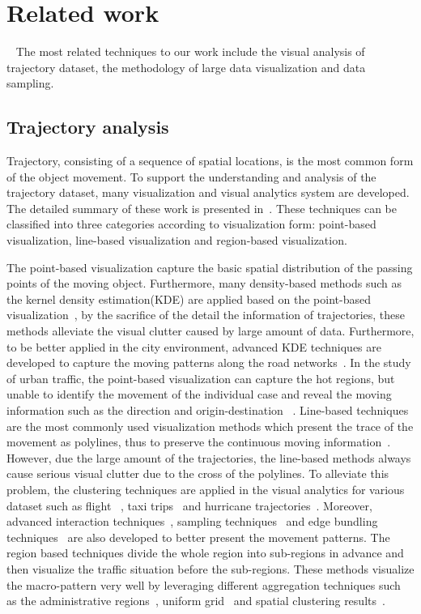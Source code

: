 \section{Related work}~\label{sec:rel}
The most related techniques to our work include the visual analysis of trajectory dataset, the methodology of large data visualization and data sampling. 
\subsection{Trajectory analysis}
Trajectory, consisting of a sequence of spatial locations, is the most common form of the object movement. To support the understanding and analysis of the trajectory dataset, many visualization and visual analytics system are developed. The detailed summary of these work is presented in~\cite{chen2015survey}. These techniques can be classified into three categories according to visualization form: point-based visualization, line-based visualization and region-based visualization. 

The point-based visualization capture the basic spatial distribution of the passing points of the moving object. Furthermore, many density-based methods such as the kernel density estimation(KDE) are applied based on the point-based visualization~\cite{liu2013vait,yang2016exploring,chae2014public}, by the sacrifice of the detail the information of trajectories, these methods alleviate the visual clutter caused by large amount of data. 
Furthermore, to be better applied in the city environment, advanced KDE techniques are developed to capture the moving patterns along the road networks~\cite{xie2008kernel, borruso2008network}. In the study of urban traffic, the point-based visualization can capture the hot regions, but unable to identify the movement of the individual case and reveal the moving information such as the direction and origin-destination ~\cite{chen2015survey}. Line-based techniques are the most commonly used visualization methods which present the trace of the movement as polylines, thus to preserve the continuous moving information~\cite{guo2011tripvista,hurter2009fromdady}. 
However, due the large amount of the trajectories, the line-based methods always cause serious visual clutter due to the cross of the polylines. To alleviate this problem, the clustering techniques are applied in the visual analytics for various dataset such as flight ~\cite{ferreira2013vector}, taxi trips~\cite{rinzivillo2008visually} and hurricane trajectories~\cite{andrienko2017clustering}. 
Moreover, advanced interaction techniques~\cite{kruger2013trajectorylenses, ferreira2013visual}, sampling techniques~\cite{} and edge bundling techniques~\cite{zeng2019route} are also developed to better present the movement patterns. The region based techniques divide the whole region into sub-regions in advance and then visualize the traffic situation before the sub-regions. These methods visualize the macro-pattern very well by leveraging different aggregation techniques such as the administrative regions~\cite{guo2009flow}, uniform grid~\cite{wood2010visualisation} and spatial clustering results~\cite{von2015mobilitygraphs}.



